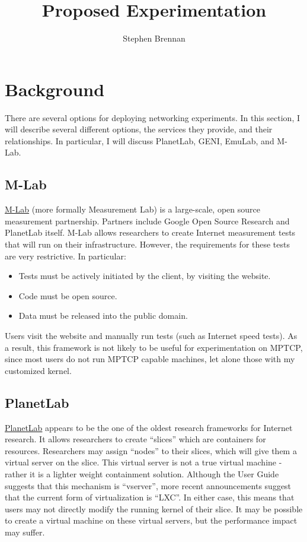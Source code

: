 \documentclass{article}
\title{Proposed Experimentation}
\author{Stephen Brennan}
\begin{document}
\maketitle

\section{Background}

There are several options for deploying networking experiments. In this section,
I will describe several different options, the services they provide, and their
relationships. In particular, I will discuss PlanetLab, GENI, EmuLab, and M-Lab.

\subsection{M-Lab}

\href{https://measurementlab.net}{M-Lab} (more formally Measurement Lab) is a
large-scale, open source measurement partnership. Partners include Google Open
Source Research and PlanetLab itself. M-Lab allows researchers to create
Internet measurement tests that will run on their infrastructure. However, the
requirements for these tests are very restrictive. In particular:

\begin{itemize}
\item Tests must be actively initiated by the client, by visiting the website.
\item Code must be open source.
\item Data must be released into the public domain.
\end{itemize}

Users visit the website and manually run tests (such as Internet speed tests).
As a result, this framework is not likely to be useful for experimentation on
MPTCP, since most users do not run MPTCP capable machines, let alone those with
my customized kernel.

\subsection{PlanetLab}

\href{https://www.planet-lab.org/}{PlanetLab} appears to be the one of the
oldest research frameworks for Internet research. It allows researchers to
create ``slices'' which are containers for resources. Researchers may assign
``nodes'' to their slices, which will give them a virtual server on the slice.
This virtual server is not a true virtual machine - rather it is a lighter
weight containment solution. Although the User Guide suggests that this
mechanism is ``vserver'', more recent announcements suggest that the current
form of virtualization is ``LXC''. In either case, this means that users may not
directly modify the running kernel of their slice. It may be possible to create
a virtual machine on these virtual servers, but the performance impact may
suffer.
\end{document}
